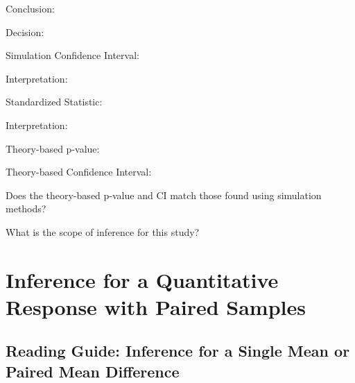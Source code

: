 \documentclass[
]{report}
\newcommand{\rgi}{\hspace{24pt}}  %
\begin{document}
\rgi \rgi Conclusion:

\vspace{0.8in}

\rgi \rgi Decision:

\vspace{0.3in}

\rgi Simulation Confidence Interval:

\vspace{0.3in}

\rgi \rgi Interpretation:

\vspace{0.8in}

\rgi Standardized Statistic:

\vspace{0.3in}

\rgi \rgi Interpretation:

\vspace{0.8in}

\rgi Theory-based p-value:

\vspace{0.3in}

\rgi Theory-based Confidence Interval:

\vspace{0.3in}

\rgi Does the theory-based p-value and CI match those found using simulation methods?

\vspace{0.8in}

\rgi What is the scope of inference for this study?

\vspace{0.8in}

\newpage

\hypertarget{inference-for-a-quantitative-response-with-paired-samples}{%
\chapter{Inference for a Quantitative Response with Paired Samples}\label{inference-for-a-quantitative-response-with-paired-samples}}

\hypertarget{reading-guide-inference-for-a-single-mean-or-paired-mean-difference}{%
\section{Reading Guide: Inference for a Single Mean or Paired Mean Difference}\label{reading-guide-inference-for-a-single-mean-or-paired-mean-difference}}
\end{document}
